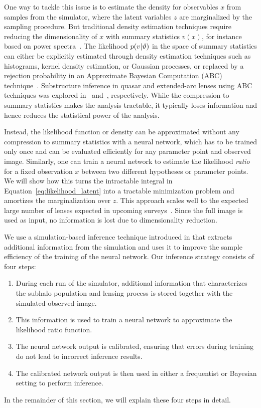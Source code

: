 \documentclass[twocolumn]{aastex63}
\begin{document}
One way to tackle this issue is to estimate the density for observables $x$ from samples from the simulator, where the latent variables $z$ are marginalized by the sampling procedure. But traditional density estimation techniques require reducing the dimensionality of $x$ with summary statistics $v(x)$, for instance based on power spectra~\citep{1403.2720,1506.01724,1707.04590,1710.03075,1809.00004,1806.07897,1808.03501}. The likelihood $p(v|\vartheta)$ in the space of summary statistics can either be explicitly estimated through density estimation techniques such as histograms, kernel density estimation, or Gaussian processes, or replaced by a rejection probability in an Approximate Bayesian Computation (ABC) technique~\citep{rubin1984}. Substructure inference in quasar and extended-arc lenses using ABC techniques was explored in~\citet{1712.04945} and~\citet{1702.00009}, respectively. While the compression to summary statistics makes the analysis tractable, it typically loses information and hence reduces the statistical power of the analysis.

Instead, the likelihood function or density can be approximated without any compression to summary statistics with a neural network, which has to be trained only once and can be evaluated efficiently for any parameter point and observed image. Similarly, one can train a neural network to estimate the likelihood \emph{ratio} for a fixed observation $x$ between two different hypotheses or parameter points. We will show how this turns the intractable integral in Equation~\eqref{eq:likelihood_latent} into a tractable minimization problem and amortizes the marginalization over $z$. This approach scales well to the expected large number of lenses expected in upcoming surveys~\citep{1001.2037,1003.5567,2015ApJ...811...20C}. Since the full image is used as input, no information is lost due to dimensionality reduction.

We use a simulation-based inference technique introduced in \citet{1805.00013,1805.00020,1805.12244} that extracts additional information from the simulation and uses it to improve the sample efficiency of the training of the neural network. Our inference strategy consists of four steps:
%
\begin{enumerate}
  \item During each run of the simulator, additional information that characterizes the subhalo population and lensing process is stored together with the simulated observed image.
  \item This information is used to train a neural network to approximate the likelihood ratio function.
  \item The neural network output is calibrated, ensuring that errors during training do not lead to incorrect inference results.
  \item The calibrated network output is then used in either a frequentist or Bayesian setting to perform inference.
\end{enumerate}
%
In the remainder of this section, we will explain these four steps in detail.
\end{document}

